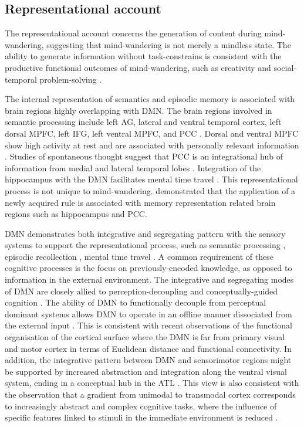 \subsection{Representational account}

The representational account concerns the generation of content during mind-wandering, suggesting that mind-wandering is not merely a mindless state. The ability to generate information without task-constrains is consistent with the productive functional outcomes of mind-wandering, such as creativity \cite{Baird2012,Smeekens2016} and social-temporal problem-solving \cite{RubyPlos2013,PoerioFrontiers2016,Medea2016}. 

The internal representation of semantics and episodic memory is associated with brain regions highly overlapping with DMN. The brain regions involved in semantic processing include left AG, lateral and ventral temporal cortex, left dorsal MPFC, left IFG, left ventral MPFC, and PCC \cite{Binder2009,Lambon-Ralph2017}. Dorsal and ventral MPFC show high activity at rest and are associated with personally relevant information \cite{Gusnard2001}. Studies of spontaneous thought suggest that PCC is an integrational hub of information from medial and lateral temporal lobes \cite{Smallwood2016}. Integration of the hippocampus with the DMN facilitates mental time travel \cite{Karapanagiotidis2017}. This representational process is not unique to mind-wandering.  demonstrated that the application of a newly acquired rule is associated with memory representation related brain regions such as hippocampus and PCC. 

DMN demonstrates both integrative and segregating pattern with the sensory systems to support the representational process, such as semantic processing \cite{Binder2009,Krieger-Redwood2016}, episodic recollection \cite{Rugg2013}, mental time travel \cite{Schacter2007}. A common requirement of these cognitive processes is the focus on previously-encoded knowledge, as opposed to information in the external environment.
The integrative and segregating modes of DMN are closely allied to perception-decoupling and conceptually-guided cognition \cite{Murphy2018}. 
The ability of DMN to functionally decouple from perceptual dominant systems allows DMN to operate in an offline manner dissociated from the external input \cite{Smallwood2013}. This is consistent with recent observations of the functional organisation of the cortical surface \cite{Margulies2016} where the DMN is far from primary visual and motor cortex in terms of Euclidean distance and functional connectivity. 
In addition, the integrative pattern between DMN and sensorimotor regions might be supported by increased abstraction and integration along the ventral visual system, ending in a conceptual hub in the ATL \cite{Lambon-Ralph2017}. 
This view is also consistent with the observation that a gradient from unimodal to transmodal cortex \cite{Margulies2016} corresponds to increasingly abstract and complex cognitive tasks, where the influence of specific features linked to stimuli in the immediate environment is reduced \cite{Mesulam1998,Buckner2013,Margulies2016}.

